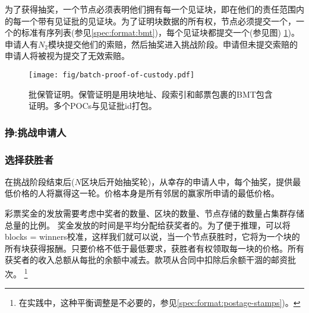 为了获得抽奖，一个节点必须表明他们拥有每一个见证块，即在他们的责任范围内的每一个带有见证批的见证块。为了证明块数据的所有权，节点必须提交一个，一个的标准有序列表(参见\ref{spec:format:bmt})，每个见证块都提交一个(参见图) 
\ref{fig:batch-proof-of-custody})。申请人有$N_2$模块提交他们的索赔，然后抽奖进入挑战阶段。申请但未提交索赔的申请人将被视为提交了无效索赔。   


\begin{figure}[htbp]
  \centering
   \texttt{[image: fig/batch-proof-of-custody.pdf]}
  \caption[批保管证明\statusgreen]{批保管证明。保管证明是用块地址、段索引和邮票包裹的BMT包含证明。多个POCs与见证批id打包。}
  \label{fig:batch-proof-of-custody}
\end{figure}

\subsubsection{挣:挑战申请人}


\subsubsection{选择获胜者}

在挑战阶段结束后($N$区块后开始抽奖轮)，从幸存的申请人中，每个抽奖，提供最低价格的人将赢得这一轮。价格本身是所有邻居的赢家所申请的最低价格。

彩票奖金的发放需要考虑中奖者的数量、区块的数量、节点存储的数量占集群存储总量的比例。
奖金发放的时间是平均分配给获奖者的。为了便于推理，可以将blocks = winners校准，这样我们就可以说，当一个节点获胜时，它将为一个块的所有块获得报酬。只要价格不低于最低要求，获胜者有权领取每一块的价格。所有获奖者的收入总额从每批的余额中减去。款项从合同中扣除后余额干涸的邮资批次。%
%
\footnote{在实践中，这种平衡调整是不必要的，参见\ref{spec:format:postage-stamps})。
}

